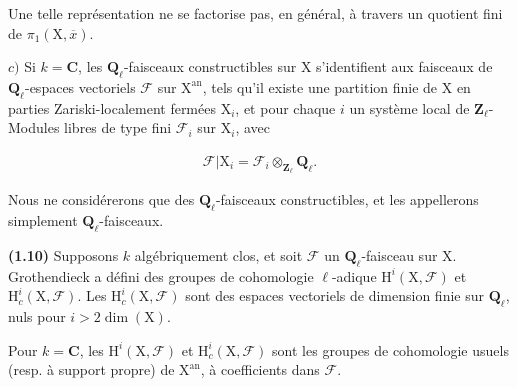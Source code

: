 \documentclass[10pt,leqno]{article}
\begin{document}
\noindent Une telle représentation ne se factorise pas, en général, à travers un quotient fini de \(\pi _{1}(\mathrm{X},\overline{x})\).\par

\noindent \(c)\) Si \(k=\mathbf{C}\), les \(\mathbf{Q}_{\ell }\)-faisceaux constructibles sur \(\mathrm{X}\) s’identifient aux faisceaux de \(\mathbf{Q}_{\ell }\)-espaces vectoriels \(\mathcal{F} \) sur \(\mathrm{X}^{\mathrm{an}}\), tels qu’il existe une partition finie de \(\mathrm{X}\) en parties Zariski-localement fermées \(\mathrm{X}_{i}\), et pour chaque \(i\) un système local de \(\mathbf{Z}_{\ell }\)-Modules libres de type fini \(\mathcal{F} _{i}\) sur \(\mathrm{X}_{i}\), avec\par

\begin{equation*}\begin{gathered}\mathcal{F} |\mathrm{X}_{i} = \mathcal{F} _{i} \otimes _{\mathbf{Z}_{\ell }} \mathbf{Q}_{\ell }.\end{gathered}\end{equation*}

\noindent Nous ne considérerons que des \(\mathbf{Q}_{\ell }\)-faisceaux constructibles, et les appellerons simplement \(\mathbf{Q}_{\ell }\)-faisceaux.\par

\noindent \textbf{(1.10)} Supposons \(k\) algébriquement clos, et soit \(\mathcal{F} \) un \(\mathbf{Q}_{\ell }\)-faisceau sur \(\mathrm{X}\). Grothendieck a défini des groupes de cohomologie \(\ell \)-adique \(\mathrm{H}^{i}(\mathrm{X},\mathcal{F} )\) et \(\mathrm{H}_{c}^{i}(\mathrm{X},\mathcal{F} )\). Les \(\mathrm{H}_{c}^{i}(\mathrm{X},\mathcal{F} )\) sont des espaces vectoriels de dimension finie sur \(\mathbf{Q}_{\ell }\), nuls pour \(i>2 \operatorname{dim}(\mathrm{X})\).\par

\clearpage

\label{physical-7}

\noindent Pour \(k=\mathbf{C}\), les \(\mathrm{H}^{i}(\mathrm{X},\mathcal{F} )\) et \(\mathrm{H}_{c}^{i}(\mathrm{X},\mathcal{F} )\) sont les groupes de cohomologie usuels (resp. à support propre) de \(\mathrm{X}^{\mathrm{an}}\), à coefficients dans \(\mathcal{F} \).\par
\end{document}
